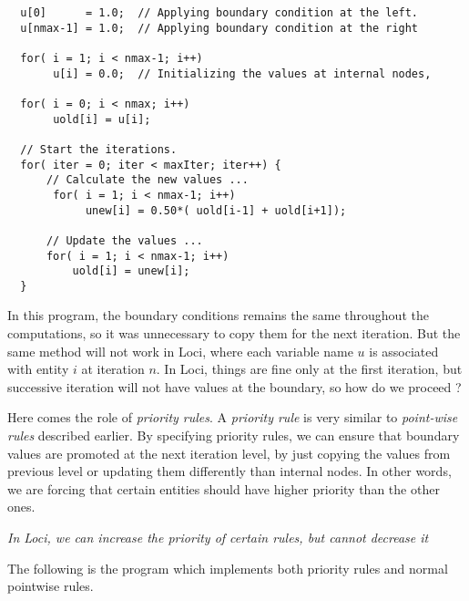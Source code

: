 \begin{verbatim}
  u[0]      = 1.0;  // Applying boundary condition at the left.
  u[nmax-1] = 1.0;  // Applying boundary condition at the right

  for( i = 1; i < nmax-1; i++) 
       u[i] = 0.0;  // Initializing the values at internal nodes,

  for( i = 0; i < nmax; i++) 
       uold[i] = u[i];
   
  // Start the iterations.
  for( iter = 0; iter < maxIter; iter++) {
      // Calculate the new values ...
       for( i = 1; i < nmax-1; i++) 
            unew[i] = 0.50*( uold[i-1] + uold[i+1]);

      // Update the values ...
      for( i = 1; i < nmax-1; i++) 
          uold[i] = unew[i];
  }
\end{verbatim}

\par In this program, the boundary conditions remains the same throughout
the computations, so it was unnecessary to copy them for the next iteration.
But the same method will not work in Loci, where each variable name $u$ is
associated with entity $i$ at iteration $n$. In Loci, things are fine only 
at the first iteration, but successive iteration will not have values at 
the boundary, so how do we proceed ?
%
\par Here comes the role of {\em priority rules}. A {\em priority rule} is
very similar to {\em point-wise rules} described earlier. By specifying
priority rules, we can ensure that boundary values are promoted at the next
iteration level, by just copying the values from previous level or updating
them differently than internal nodes. In other words, we are forcing that 
certain entities should have higher priority than the other ones. 
\par {\em In Loci, we can increase the priority of certain rules, but cannot
decrease it}

The following is the program which implements both priority rules and 
normal pointwise rules.

